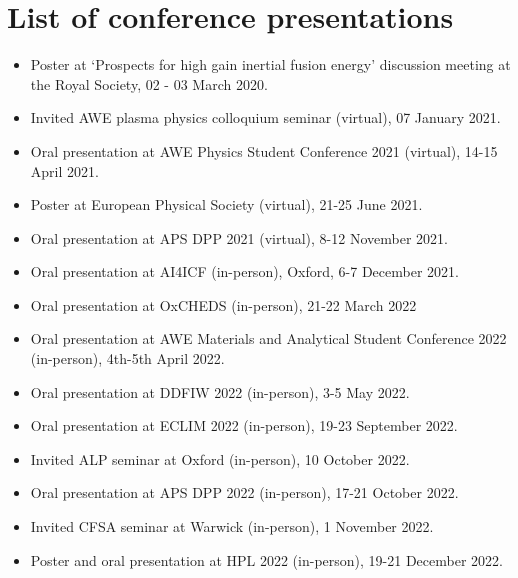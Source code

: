 \section{List of conference presentations}

\begin{itemize}
\item Poster at `Prospects for high gain inertial fusion energy' discussion meeting at the Royal Society, 02 - 03 March 2020.
\item Invited AWE plasma physics colloquium seminar (virtual), 07 January 2021.
\item Oral presentation at AWE Physics Student Conference 2021 (virtual), 14-15 April 2021.
\item Poster at European Physical Society (virtual), 21-25 June 2021.
\item Oral presentation at APS DPP 2021 (virtual), 8-12 November 2021.
\item Oral presentation at AI4ICF (in-person), Oxford, 6-7 December 2021.
\item Oral presentation at OxCHEDS (in-person), 21-22 March 2022
\item Oral presentation at AWE Materials and Analytical Student Conference 2022 (in-person), 4th-5th April 2022. 
\item Oral presentation at DDFIW 2022 (in-person), 3-5 May 2022.
\item Oral presentation at ECLIM 2022 (in-person), 19-23 September 2022.
\item Invited ALP seminar at Oxford (in-person), 10 October 2022.
\item Oral presentation at APS DPP 2022 (in-person), 17-21 October 2022.
\item Invited CFSA seminar at Warwick (in-person), 1 November 2022.
\item Poster and oral presentation at HPL 2022 (in-person), 19-21 December 2022.
\end{itemize}


